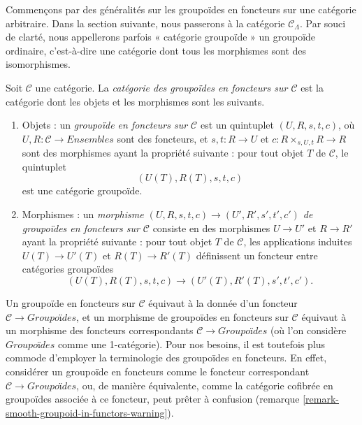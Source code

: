 \noindent
Commençons par des généralités sur les groupoïdes en foncteurs sur une
catégorie arbitraire. Dans la section suivante, nous passerons à la catégorie
$\mathcal{C}_\Lambda$. Par souci de clarté, nous appellerons parfois
« catégorie groupoïde » un groupoïde ordinaire, c'est-à-dire une catégorie
dont tous les morphismes sont des isomorphismes.

\begin{definition}
\label{definition-groupoid-in-functors}
Soit $\mathcal{C}$ une catégorie. La {\it catégorie des groupoïdes en
foncteurs sur $\mathcal{C}$} est la catégorie dont les objets et les morphismes
sont les suivants.
\begin{enumerate}
\item Objets : un {\it groupoïde en foncteurs sur $\mathcal{C}$} est un
quintuplet
$(U, R, s, t, c)$, où $U, R : \mathcal{C} \to \textit{Ensembles}$ sont des
foncteurs, et $s, t : R \to U$ et $c : R \times_{s, U, t} R \to R$ sont
des morphismes ayant la propriété suivante : pour tout objet $T$ de
$\mathcal{C}$, le quintuplet
$$
(U(T), R(T), s, t, c)
$$
est une catégorie groupoïde.
\item Morphismes : un {\it morphisme
$(U, R, s, t, c) \to (U', R', s', t', c')$ de groupoïdes en foncteurs sur
$\mathcal{C}$} consiste en des morphismes $U \to U'$ et $R \to R'$ ayant la
propriété suivante : pour tout objet $T$ de $\mathcal{C}$, les applications
induites $U(T) \to U'(T)$ et $R(T) \to R'(T)$ définissent un foncteur entre
catégories groupoïdes
$$
(U(T), R(T), s, t, c) \to (U'(T), R'(T), s', t', c').
$$
\end{enumerate}
\end{definition}

\begin{remark}
\label{remark-confusion-groupoids-in-functors}
Un groupoïde en foncteurs sur $\mathcal{C}$ équivaut à la donnée d'un foncteur
$\mathcal{C} \to \textit{Groupoïdes}$, et un morphisme de groupoïdes en
foncteurs sur $\mathcal{C}$ équivaut à un morphisme des foncteurs
correspondants $\mathcal{C} \to \textit{Groupoïdes}$ (où l'on considère
$\textit{Groupoïdes}$ comme une 1-catégorie). Pour nos
besoins, il est toutefois plus commode d'employer la terminologie des
groupoïdes en foncteurs. En effet, considérer un groupoïde en foncteurs comme
le foncteur correspondant $\mathcal{C} \to \textit{Groupoïdes}$, ou, de manière
équivalente, comme la catégorie cofibrée en groupoïdes associée à ce foncteur,
peut prêter à confusion (remarque
\ref{remark-smooth-groupoid-in-functors-warning}).
\end{remark}

